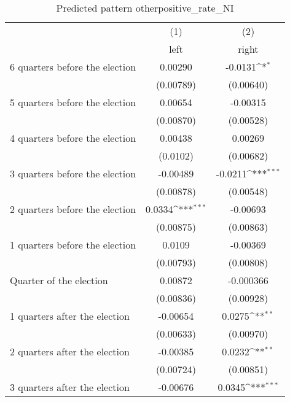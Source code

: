 \begin{table}[htbp]\centering
\def\sym#1{\ifmmode^{#1}\else\(^{#1}\)\fi}
\caption{Predicted pattern otherpositive\_rate\_NI}
\begin{tabular}{l*{2}{c}}
\hline\hline
                    &\multicolumn{1}{c}{(1)}&\multicolumn{1}{c}{(2)}\\
                    &\multicolumn{1}{c}{left}&\multicolumn{1}{c}{right}\\
\hline
 6 quarters before the election&     0.00290         &     -0.0131\sym{*}  \\
                    &   (0.00789)         &   (0.00640)         \\
[1em]
 5 quarters before the election&     0.00654         &    -0.00315         \\
                    &   (0.00870)         &   (0.00528)         \\
[1em]
 4 quarters before the election&     0.00438         &     0.00269         \\
                    &    (0.0102)         &   (0.00682)         \\
[1em]
 3 quarters before the election&    -0.00489         &     -0.0211\sym{***}\\
                    &   (0.00878)         &   (0.00548)         \\
[1em]
 2 quarters before the election&      0.0334\sym{***}&    -0.00693         \\
                    &   (0.00875)         &   (0.00863)         \\
[1em]
 1 quarters before the election&      0.0109         &    -0.00369         \\
                    &   (0.00793)         &   (0.00808)         \\
[1em]
Quarter of the election&     0.00872         &   -0.000366         \\
                    &   (0.00836)         &   (0.00928)         \\
[1em]
 1 quarters after the election&    -0.00654         &      0.0275\sym{**} \\
                    &   (0.00633)         &   (0.00970)         \\
[1em]
 2 quarters after the election&    -0.00385         &      0.0232\sym{**} \\
                    &   (0.00724)         &   (0.00851)         \\
[1em]
 3 quarters after the election&    -0.00676         &      0.0345\sym{***}\\

\end{tabular}
\end{table}

